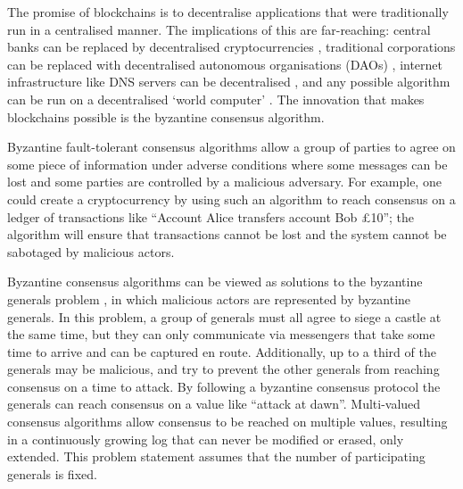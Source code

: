 
The promise of blockchains is to decentralise applications that were traditionally run in a centralised manner. The implications of this are far-reaching: central banks can be replaced by decentralised cryptocurrencies \cite{nakamotoBitcoinPeertoPeerElectronic2008,perniceCryptocurrency2021}, traditional corporations can be replaced with decentralised autonomous organisations (DAOs) \cite{hassanDecentralizedAutonomousOrganization2021,ethereumWhite}, internet infrastructure like DNS servers can be decentralised \cite{EthereumNameService}, and any possible algorithm can be run on a decentralised `world computer' \cite{ethereumWhite,ethereumYellow}. The innovation that makes blockchains possible is the byzantine consensus algorithm.

Byzantine fault-tolerant consensus algorithms allow a group of parties to agree on some piece of information under adverse conditions where some messages can be lost and some parties are controlled by a malicious adversary. For example, one could create a cryptocurrency by using such an algorithm to reach consensus on a ledger of transactions like ``Account Alice transfers account Bob £10''; the algorithm will ensure that transactions cannot be lost and the system cannot be sabotaged by malicious actors.

Byzantine consensus algorithms can be viewed as solutions to the byzantine generals problem \cite{lamportByzantineGeneralsProblem1982}, in which malicious actors are represented by byzantine generals. In this problem, a group of generals must all agree to siege a castle at the same time, but they can only communicate via messengers that take some time to arrive and can be captured en route. Additionally, up to a third of the generals may be malicious, and try to prevent the other generals from reaching consensus on a time to attack. By following a byzantine consensus protocol the generals can reach consensus on a value like ``attack at dawn''. Multi-valued consensus algorithms allow consensus to be reached on multiple values, resulting in a continuously growing log that can never be modified or erased, only extended. This problem statement assumes that the number of participating generals is fixed.


